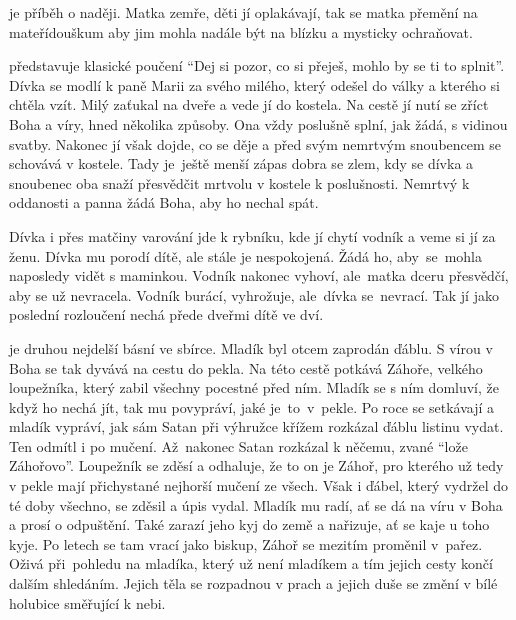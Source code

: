 \documentclass{extarticle} %
\begin{document}


{\setlength{\parindent}{5pt}
 je příběh o naději. Matka zemře, děti jí oplakávají, tak se matka přemění na mateřídouškum aby jim mohla nadále být na blízku a mysticky ochraňovat.

 představuje klasické poučení \enquote{Dej si pozor, co si přeješ, mohlo by se ti to splnit}. Dívka se modlí k paně Marii za svého milého, který odešel do války a kterého si chtěla vzít. Milý zaťukal na dveře a vede jí do kostela. Na cestě jí nutí se zříct Boha a víry, hned několika způsoby. Ona vždy poslušně splní, jak žádá, s vidinou svatby. Nakonec jí však dojde, co se děje a před svým nemrtvým snoubencem se schovává v kostele. Tady je~ještě menší zápas dobra se zlem, kdy se dívka a snoubenec oba snaží přesvědčit mrtvolu v kostele k poslušnosti. Nemrtvý k oddanosti a panna žádá Boha, aby ho nechal spát.

 Dívka i přes matčiny varování jde k rybníku, kde jí chytí vodník a veme si jí za ženu. Dívka mu porodí dítě, ale stále je nespokojená. Žádá ho, aby~se~mohla naposledy vidět s maminkou. Vodník nakonec vyhoví, ale~matka dceru přesvědčí, aby se už nevracela. Vodník burácí, vyhrožuje, ale~dívka se~nevrací. Tak jí jako poslední rozloučení nechá přede dveřmi dítě ve dví.

 je druhou nejdelší básní ve sbírce. Mladík byl otcem zaprodán ďáblu. S vírou v Boha se tak dyvává na cestu do pekla. Na této cestě potkává Záhoře, velkého loupežníka, který zabil všechny pocestné před ním. Mladík se s ním domluví, že když ho nechá jít, tak mu povypráví, jaké je~to~v~pekle. Po roce se setkávají a mladík vypráví, jak sám Satan při výhružce křížem rozkázal ďáblu listinu vydat. Ten odmítl i po mučení. Až~nakonec Satan rozkázal k něčemu, zvané \enquote{lože Záhořovo}. Loupežník se zděsí a odhaluje, že to on je Záhoř, pro kterého už tedy v pekle mají přichystané nejhorší mučení ze všech. Však i ďábel, který vydržel do té doby všechno, se zděsil a úpis vydal. Mladík mu radí, ať se dá na víru v Boha a prosí o odpuštění. Také zarazí jeho kyj do země a nařizuje, ať se kaje u toho kyje. Po letech se tam vrací jako biskup, Záhoř se mezitím proměnil v~pařez. Oživá při~pohledu na mladíka, který už není mladíkem a tím jejich cesty končí dalším shledáním. Jejich těla se rozpadnou v prach a jejich duše se změní v bílé holubice směřující k nebi.
}\\
\end{document}
